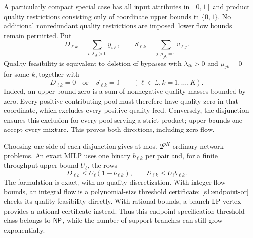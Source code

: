 A particularly compact special case has all input attributes in $[0,1]$
and product quality restrictions consisting only of coordinate upper
bounds in $\{0,1\}$. No additional nonredundant quality restrictions
are imposed; lower flow bounds remain permitted. Put
\[
 D_{\ell k}=\sum_{i:\lambda_{ik}>0}y_{i\ell},\qquad
 S_{\ell k}=\sum_{j:\overline\mu_{jk}=0}v_{\ell j}.
\]
Quality feasibility is equivalent to deletion of bypasses with
$\lambda_{ik}>0$ and $\overline\mu_{jk}=0$ for some $k$, together with
\begin{equation}
 D_{\ell k}=0\quad\text{or}\quad S_{\ell k}=0
             \qquad(\ell\in L, k=1,\ldots,K).\label{s1:endpoint-or}
\end{equation}
Indeed, an upper bound zero is a sum of nonnegative quality masses
bounded by zero. Every positive contributing pool must therefore have
quality zero in that coordinate, which excludes every positive-quality
feed. Conversely, the disjunction ensures this exclusion for every
pool serving a strict product; upper bounds one accept every mixture.
This proves both directions, including zero flow.

Choosing one side of each disjunction gives at most $2^{pK}$ ordinary
network problems. An exact MILP uses one binary $b_{\ell k}$ per pair
and, for a finite throughput upper bound $U_\ell$, the rows
\[
 D_{\ell k}\le U_\ell(1-b_{\ell k}),\qquad
 S_{\ell k}\le U_\ell b_{\ell k}.
\]
The formulation is exact, with no quality discretization. With integer
flow bounds, an integral flow is a polynomial-size threshold certificate;
\eqref{s1:endpoint-or} checks its quality feasibility directly. With
rational bounds, a branch LP vertex provides a rational certificate
instead. Thus this endpoint-specification threshold class belongs to
$\mathsf{NP}$, while the number of support branches can still grow exponentially.
